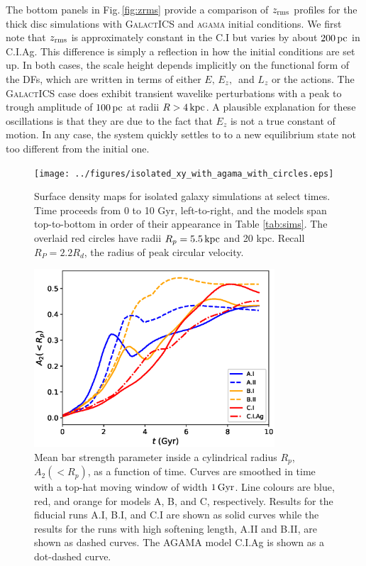 The bottom panels in Fig.\,\ref{fig:zrms} provide a comparison of
$z_{\rm rms}$ profiles for the thick disc simulations with
\textsc{GalactICS} and \textsc{agama} initial conditions.  We first
note that $z_{\rm rms}$ is approximately constant in the C.I but varies by
about $200\,{\rm pc}$ in C.I.Ag.  This difference is simply a
reflection in how the initial conditions are set up.  In both cases,
the scale height depends implicitly on the functional form of the DFs,
which are written in terms of either $E,\,E_z,\,$ and $L_z$ or the
actions.  The \textsc{GalactICS} case does exhibit transient wavelike
perturbations with a peak to trough amplitude of $100\,{\rm pc}$ at
radii $R>4\,{\rm kpc}$.  A plausible explanation for these
oscillations is that they are due to the fact that $E_z$ is not a true
constant of motion.  In any case, the system quickly settles to to a
new equilibrium state not too different from the initial one.
\begin{figure}
	\centering
	\texttt{[image: ../figures/isolated\_xy\_with\_agama\_with\_circles.eps]}
	\caption{Surface density maps for isolated galaxy simulations
          at select times. Time proceeds from 0 to 10 Gyr,
          left-to-right, and the models span top-to-bottom in order of
          their appearance in Table \ref{tab:sims}. The overlaid red
          circles have radii $R_p=5.5\,{\rm kpc}$ and 20 kpc. {Recall $R_P=2.2 R_d$, the 
          radius of peak circular velocity.}}
	\label{fig:face_on_isolated}
\end{figure}

\begin{figure}
	\centering
	\includegraphics[width=0.8\textwidth]{../figures/isolated_a2_vs_t_2rd_weighted.eps}
	\caption{Mean bar strength parameter inside a cylindrical
          radius $R_p$, $A_2(<R_p)$, as a function of time. Curves are
          smoothed in time with a top-hat moving window of width
          $1\,{\rm Gyr}$.  Line colours are blue, red, and {orange} for
          models A, B, and C, respectively.  Results for the
          fiducial runs A.I, B.I, and C.I are shown as solid curves
          while the results for the runs with high softening length,
          A.II and B.II, are shown as dashed curves.  The
          \textsc{AGAMA} model C.I.Ag is shown as a dot-dashed
          curve.} \label{fig:isolated_a2_vs_t}
\end{figure}

